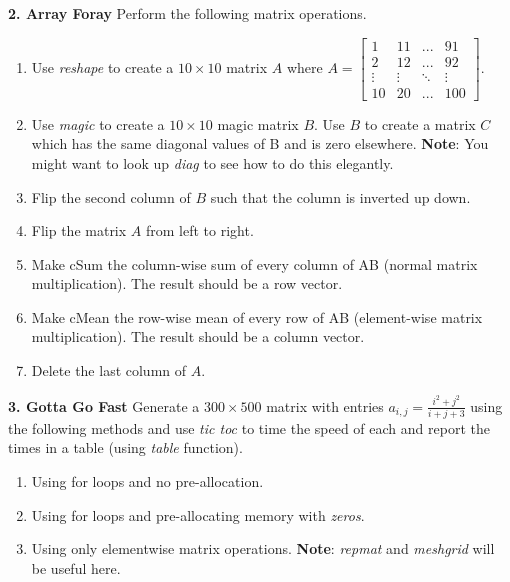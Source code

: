 \documentclass[11pt]{article}
\newenvironment{qparts}{\begin{enumerate}[{(}a{)}]}{\end{enumerate}}
\begin{document}
 \noindent \textbf{2. Array Foray} Perform the following matrix operations. 
 \begin{qparts}
 \item Use \emph{reshape} to create a $10 \times 10$ matrix $A$ where $A = \begin{bmatrix}1 &11 & ...& 91\\ 2&12&...&92\\ \vdots&\vdots&\ddots&\vdots\\ 10&20&...&100\end{bmatrix}$.
 \item Use \emph{magic} to create a $10 \times 10$ magic matrix $B$. Use $B$ to create a matrix $C$ which has the same diagonal values of B and is zero elsewhere. \textbf{Note}: You might want to look up \emph{diag} to see how to do this elegantly. 
 \item Flip the second column of $B$ such that the column is inverted up down.
 \item Flip the matrix $A$ from left to right.
 \item Make cSum the column-wise sum of every column of AB (normal matrix multiplication). The result should be a row vector.
 \item Make cMean the row-wise mean of every row of AB (element-wise matrix multiplication). The result should be a column vector.
 \item Delete the last column of $A$. 
 \end{qparts}
 
 \noindent \textbf{3. Gotta Go Fast} Generate a $300 \times 500$ matrix with entries $a_{i,j} = \frac{i^2+j^2}{i+j+3} $ using the following methods and use \emph{tic toc} to time the speed of each and report the times in a table (using \emph{table} function).
 \begin{qparts}
 \item Using for loops and no pre-allocation.
 \item Using for loops and pre-allocating memory with \emph{zeros}.
 \item Using only elementwise matrix operations. \textbf{Note}: \emph{repmat} and \emph{meshgrid} will be useful here. 
 \end{qparts}
\end{document}
